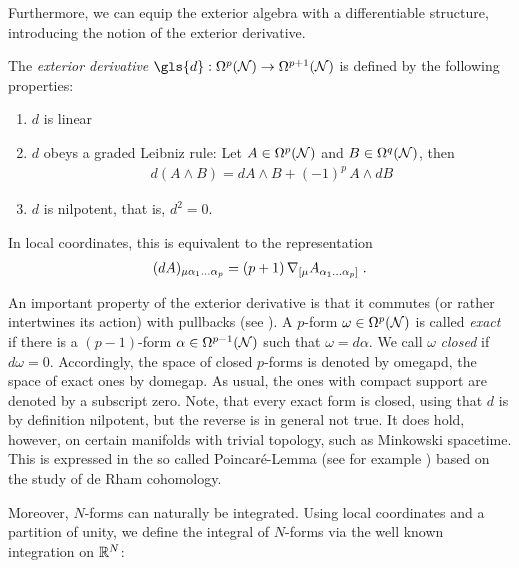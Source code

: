 %
%
%
%
%
Furthermore, we can equip the exterior algebra with a differentiable structure, introducing the notion of the exterior derivative.
\begin{definition}
	The \emph{exterior derivative} $\gls{d}:\Omega^p(\N) \to \Omega^{p+1} (\N)$ is defined by the following properties:
	\begin{enumerate}
		\item $d$ is linear
		\item $d$ obeys a graded Leibniz rule: Let $A \in \Omega^p(\mathcal{N})$ and  $B\in \Omega^q(\mathcal{N})$, then
		\begin{align}
		d(A \wedge B) = dA \wedge B + (-1)^p \, A \wedge dB
		\end{align}
		\item $d$ is nilpotent, that is,  $d^2 = 0$.
	\end{enumerate}
	In local coordinates, this is equivalent to the representation
	\begin{align}
	(dA)_{\mu \alpha_1\dots\alpha_p} = (p+1)\, \nabla_{[\mu}A_{\alpha_1\dots\alpha_p]} \;.
	\end{align}
\end{definition}
An important property of the exterior derivative is that it commutes (or rather intertwines its action) with pullbacks (see \cite[Proposition 4.1.7]{rudolph_schmidt}).
A $p$-form $\omega \in \Omega^p(\mathcal{N})$ is called \emph{exact} if there is a $(p-1)$-form $\alpha \in \Omega^{p-1}(\mathcal{N})$ such that $\omega = d\alpha$. We call $\omega$ \emph{closed} if $d \omega =0$. Accordingly, the space of closed $p$-forms is denoted by \gls{omegapd}, the space of exact ones by \gls{domegap}. As usual, the ones with compact support are denoted by a subscript zero. Note, that every exact form is closed, using that $d$ is by definition nilpotent, but the reverse is in general not true. It does hold, however, on certain manifolds with trivial topology, such as Minkowski spacetime. This is expressed in the so called Poincar\'e-Lemma (see for example \cite[Chapter 4]{bott_tu}) based on the study of de Rham cohomology.\par
%
Moreover, $N$-forms can naturally be integrated. Using local coordinates and a partition of unity, we define the integral of $N$-forms via the well known integration on $\mathbb{R}^N$:
